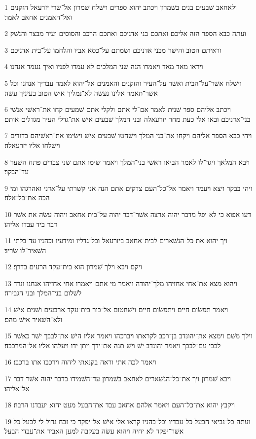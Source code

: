 \par 1 ולאחאב שׁבעים בנים בשׁמרון ויכתב יהוא ספרים וישׁלח שׁמרון אל־שׂרי יזרעאל הזקנים ואל־האמנים אחאב לאמר׃
\par 2 ועתה כבא הספר הזה אליכם ואתכם בני אדניכם ואתכם הרכב והסוסים ועיר מבצר והנשׁק׃
\par 3 וראיתם הטוב והישׁר מבני אדניכם ושׂמתם על־כסא אביו והלחמו על־בית אדניכם׃
\par 4 ויראו מאד מאד ויאמרו הנה שׁני המלכים לא עמדו לפניו ואיך נעמד אנחנו׃
\par 5 וישׁלח אשׁר־על־הבית ואשׁר על־העיר והזקנים והאמנים אל־יהוא לאמר עבדיך אנחנו וכל אשׁר־תאמר אלינו נעשׂה לא־נמליך אישׁ הטוב בעיניך עשׂה׃
\par 6 ויכתב אליהם ספר שׁנית לאמר אם־לי אתם ולקלי אתם שׁמעים קחו את־ראשׁי אנשׁי בני־אדניכם ובאו אלי כעת מחר יזרעאלה ובני המלך שׁבעים אישׁ את־גדלי העיר מגדלים אותם׃
\par 7 ויהי כבא הספר אליהם ויקחו את־בני המלך וישׁחטו שׁבעים אישׁ וישׂימו את־ראשׁיהם בדודים וישׁלחו אליו יזרעאלה׃
\par 8 ויבא המלאך ויגד־לו לאמר הביאו ראשׁי בני־המלך ויאמר שׂימו אתם שׁני צברים פתח השׁער עד־הבקר׃
\par 9 ויהי בבקר ויצא ויעמד ויאמר אל־כל־העם צדקים אתם הנה אני קשׁרתי על־אדני ואהרגהו ומי הכה את־כל־אלה׃
\par 10 דעו אפוא כי לא יפל מדבר יהוה ארצה אשׁר־דבר יהוה על־בית אחאב ויהוה עשׂה את אשׁר דבר ביד עבדו אליהו׃
\par 11 ויך יהוא את כל־הנשׁארים לבית־אחאב ביזרעאל וכל־גדליו ומידעיו וכהניו עד־בלתי השׁאיר־לו שׂריד׃
\par 12 ויקם ויבא וילך שׁמרון הוא בית־עקד הרעים בדרך׃
\par 13 ויהוא מצא את־אחי אחזיהו מלך־יהודה ויאמר מי אתם ויאמרו אחי אחזיהו אנחנו ונרד לשׁלום בני־המלך ובני הגבירה׃
\par 14 ויאמר תפשׂום חיים ויתפשׂום חיים וישׁחטום אל־בור בית־עקד ארבעים ושׁנים אישׁ ולא־השׁאיר אישׁ מהם׃
\par 15 וילך משׁם וימצא את־יהונדב בן־רכב לקראתו ויברכהו ויאמר אליו הישׁ את־לבבך ישׁר כאשׁר לבבי עם־לבבך ויאמר יהונדב ישׁ וישׁ תנה את־ידך ויתן ידו ויעלהו אליו אל־המרכבה׃
\par 16 ויאמר לכה אתי וראה בקנאתי ליהוה וירכבו אתו ברכבו׃
\par 17 ויבא שׁמרון ויך את־כל־הנשׁארים לאחאב בשׁמרון עד־השׁמידו כדבר יהוה אשׁר דבר אל־אליהו׃
\par 18 ויקבץ יהוא את־כל־העם ויאמר אלהם אחאב עבד את־הבעל מעט יהוא יעבדנו הרבה׃
\par 19 ועתה כל־נביאי הבעל כל־עבדיו וכל־כהניו קראו אלי אישׁ אל־יפקד כי זבח גדול לי לבעל כל אשׁר־יפקד לא יחיה ויהוא עשׂה בעקבה למען האביד את־עבדי הבעל׃

